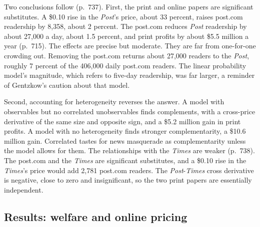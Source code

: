 Two conclusions follow (p.~737). First, the print and online papers are significant substitutes. A \$0.10 rise in the
\textit{Post}'s price, about 33 percent, raises post.com readership by 8,358, about 2 percent. The post.com reduces
\textit{Post} readership by about 27,000 a day, about 1.5 percent, and print profits by about \$5.5 million a year
(p.~715). The effects are precise but moderate. They are far from one-for-one crowding out. Removing the post.com
returns about 27,000 readers to the \textit{Post}, roughly 7 percent of the 406,000 daily post.com readers.
The linear probability model's magnitude, which refers to five-day readership, was far larger, a reminder of
Gentzkow's caution about that model.

Second, accounting for heterogeneity reverses the answer. A model with observables but no correlated unobservables
finds complements, with a cross-price derivative of the same size and opposite sign, and a \$5.2 million gain in print
profits. A model with no heterogeneity finds stronger complementarity, a \$10.6 million gain. Correlated tastes for
news masquerade as complementarity unless the model allows for them. The relationships with the \textit{Times} are
weaker (p.~738). The post.com and the \textit{Times} are significant substitutes, and a \$0.10 rise in the
\textit{Times}'s price would add 2,781 post.com readers. The \textit{Post}-\textit{Times} cross derivative is negative,
close to zero and insignificant, so the two print papers are essentially independent.

\subsection{Results: welfare and online pricing}\label{sec:10-gentzkow-welfare}

